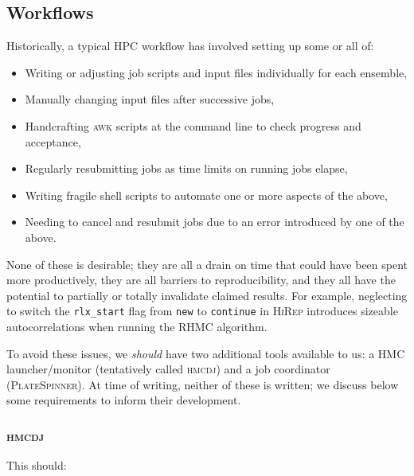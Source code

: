 \documentclass{article}
\newcommand\rfcword[1]{\emph{#1}\xspace}
\newcommand\should{\rfcword{should}}
\newcommand\program[1]{\textsc{#1}\xspace}
\begin{document}
\subsection{Workflows}

Historically,
a typical HPC workflow has involved setting up some or all of:

\begin{itemize}
  \item
        Writing or adjusting job scripts and input files individually for each ensemble,
  \item
        Manually changing input files after successive jobs,
  \item
        Handcrafting \program{awk} scripts at the command line to check progress and acceptance,
  \item
        Regularly resubmitting jobs as time limits on running jobs elapse,
  \item
        Writing fragile shell scripts to automate one or more aspects of the above,
  \item
        Needing to cancel and resubmit jobs due to an error introduced by one of the above.
\end{itemize}

None of these is desirable;
they are all a drain on time that could have been spent more productively,
they are all barriers to reproducibility,
and they all have the potential to partially or totally invalidate claimed results.
For example,
neglecting to switch the \verb|rlx_start| flag from \verb|new| to \verb|continue|
in \program{HiRep}
introduces sizeable autocorrelations when running the RHMC algorithm.

To avoid these issues,
we \should have two additional tools available to us:
a HMC launcher/monitor
(tentatively called \program{hmcdj})
and a job coordinator
(\program{PlateSpinner}).
At time of writing,
neither of these is written;
we discuss below some requirements to inform their development.

\subsubsection{\program{hmcdj}}

This should:
\end{document}
